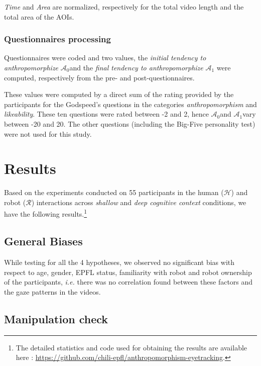 \documentclass[lettersize, noapacite, twoside, HRI]{apa_HRI}
\newcommand{\ie}{\textit{i.e.}\xspace}
\newcommand{\anti}{{$\mathcal{A}_0$\xspace}}
\newcommand{\antf}{{$\mathcal{A}_1$\xspace}}
\begin{document}
\emph{Time} and \emph{Area} are normalized, respectively for the total
video length and the total area of the AOIs.

\subsubsection{Questionnaires processing}
\label{questionnaires_processing}

Questionnaires were coded and two values, the \emph{initial tendency to
anthropomorphize} \anti and the \emph{final tendency to anthropomorphize} \antf
were computed, respectively from the pre- and post-questionnaires.

These values were computed by a direct sum of the rating provided by the
participants for the Godspeed's questions in the categories
\emph{anthropomorphism} and \emph{likeability}. These ten questions were rated
between -2 and 2, hence \anti and \antf vary between -20 and 20.  The other
questions (including the Big-Five personality test) were not used for this
study.

\section{Results}

Based on the experiments conducted on 55 participants in the human
($\mathcal{H}$) and robot ($\mathcal{R}$) interactions across \emph{shallow} and
\emph{deep cognitive context} conditions, we have the following
results.\footnote{The
detailed statistics and code used for obtaining the results are available here :
\url{https://github.com/chili-epfl/anthropomorphism-eyetracking}.}

\subsection{General Biases}

While testing for all the 4 hypotheses, we observed no significant bias with
respect to age, gender, EPFL status, familiarity with robot and robot ownership
of the participants, \ie there was no correlation found between these factors
and the gaze patterns in the videos.

\subsection{Manipulation check}
\end{document}
